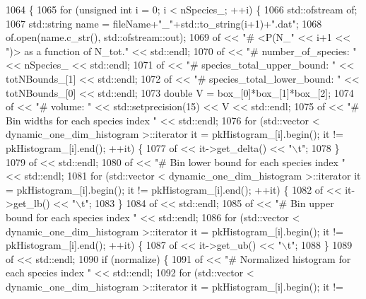 \begin{DoxyCode}
1064                                                                                 \{
1065     \textcolor{keywordflow}{for} (\textcolor{keywordtype}{unsigned} \textcolor{keywordtype}{int} i = 0; i < nSpecies\_; ++i) \{
1066         std::ofstream of;
1067         std::string name = fileName+\textcolor{stringliteral}{"\_"}+std::to\_string(i+1)+\textcolor{stringliteral}{".dat"};
1068         of.open(name.c\_str(), std::ofstream::out);
1069         of << \textcolor{stringliteral}{"# <P(N\_"} << i+1 << \textcolor{stringliteral}{")> as a function of N\_tot."} << std::endl;
1070         of << \textcolor{stringliteral}{"# number\_of\_species: "} << nSpecies\_ << std::endl;
1071         of << \textcolor{stringliteral}{"# species\_total\_upper\_bound: "} << totNBounds\_[1] << std::endl;
1072         of << \textcolor{stringliteral}{"# species\_total\_lower\_bound: "} << totNBounds\_[0] << std::endl;
1073         \textcolor{keywordtype}{double} V = box\_[0]*box\_[1]*box\_[2];
1074         of << \textcolor{stringliteral}{"# volume: "} << std::setprecision(15) << V << std::endl;
1075         of << \textcolor{stringliteral}{"# Bin widths for each species index "} << std::endl;
1076         \textcolor{keywordflow}{for} (std::vector < dynamic\_one\_dim\_histogram >::iterator it = pkHistogram\_[i].begin(); it != 
      pkHistogram\_[i].end(); ++it) \{
1077             of << it->get\_delta() << \textcolor{stringliteral}{"\(\backslash\)t"};
1078         \}
1079         of << std::endl;
1080         of << \textcolor{stringliteral}{"# Bin lower bound for each species index "} << std::endl;
1081         \textcolor{keywordflow}{for} (std::vector < dynamic\_one\_dim\_histogram >::iterator it = pkHistogram\_[i].begin(); it != 
      pkHistogram\_[i].end(); ++it) \{
1082             of << it->get\_lb() << \textcolor{stringliteral}{"\(\backslash\)t"};
1083         \}
1084         of << std::endl;
1085         of << \textcolor{stringliteral}{"# Bin upper bound for each species index "} << std::endl;
1086         \textcolor{keywordflow}{for} (std::vector < dynamic\_one\_dim\_histogram >::iterator it = pkHistogram\_[i].begin(); it != 
      pkHistogram\_[i].end(); ++it) \{
1087             of << it->get\_ub() << \textcolor{stringliteral}{"\(\backslash\)t"};
1088         \}
1089         of << std::endl;
1090         \textcolor{keywordflow}{if} (normalize) \{
1091             of << \textcolor{stringliteral}{"# Normalized histogram for each species index "} << std::endl;
1092             \textcolor{keywordflow}{for} (std::vector < dynamic\_one\_dim\_histogram >::iterator it = pkHistogram\_[i].begin(); it != 

\end{DoxyCode}
